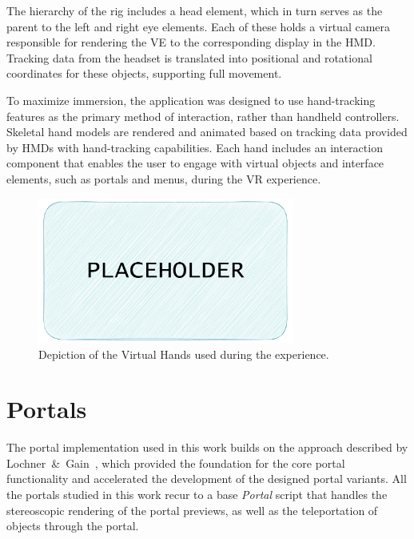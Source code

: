 The hierarchy of the rig includes a head element, which in turn serves as the parent to the left and right eye elements. 
Each of these holds a virtual camera responsible for rendering the \gls{VE} to the corresponding display in the \gls{HMD}. 
Tracking data from the headset is translated into positional and rotational coordinates for these objects, supporting full 
 movement.

To maximize immersion, the application was designed to use hand-tracking features as the primary method of interaction, 
rather than handheld controllers. Skeletal hand models are rendered and animated based on tracking data provided by \glspl{HMD} with hand-tracking capabilities. Each hand includes an interaction component that enables the user to engage with virtual objects and interface elements, such as portals and menus, during the \gls{VR} experience.

\begin{figure}[t]
    \centering
     \includegraphics[width=0.75\textwidth]{NOVAthesisFiles/Images/placeholder.pdf}
     \caption[Depiction of the Virtual Hands]
     {Depiction of the Virtual Hands used during the experience.}
     \label{fig:player}
\end{figure}



\section{Portals}
\label{sec:portals}

The portal implementation used in this work builds on the approach described by Lochner~\&~Gain~\cite{Lochner2021}, which provided the foundation 
for the core portal functionality and accelerated the development of the designed portal variants.
All the portals studied in this work recur to a base \textit{Portal} script that handles the stereoscopic rendering of the portal previews, as 
well as the teleportation of objects through the portal.

